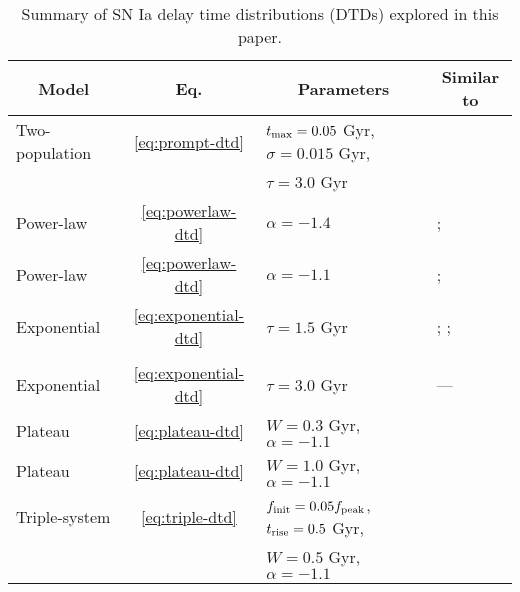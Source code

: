 \documentclass[twocolumn,twocolappendix,linenumbers,trackchanges]{aastex631}
\begin{document}
\begin{table*}
    \centering
    \caption{Summary of SN Ia delay time distributions (DTDs) explored in this paper.}
    \label{tab:dtds}
    \begin{tabular}{lcll}
        \hline\hline
        \multicolumn{1}{c}{Model} & Eq. & \multicolumn{1}{c}{Parameters} & \multicolumn{1}{c}{Similar to} \\
        \hline
        Two-population  & \ref{eq:prompt-dtd}   & $t_{\rm max}=0.05$ Gyr, $\sigma=0.015$ Gyr, & \citet{Mannucci2006-TwoPopulations} \\
                        &                       & $\tau=3.0$ Gyr & \\
        Power-law   & \ref{eq:powerlaw-dtd} & $\alpha=-1.4$                 & \citet[][cluster]{Maoz2017-CosmicDTD}; 
                                                      \citet{Heringer2019-FieldGalaxyDTD}       \\
        Power-law   & \ref{eq:powerlaw-dtd} & $\alpha=-1.1$                 & \citet[][field]{Maoz2017-CosmicDTD}; 
                                                      \citet{Wiseman2021-DESRates}              \\
        Exponential & \ref{eq:exponential-dtd}  & $\tau=1.5$ Gyr    & \citet[][SD]{Greggio2005-AnalyticalRates};
                                                                      \citet{Schonrich2009-RadialMixing};       \\
                    &                           &                   & \citet{Weinberg2017-ChemicalEquilibrium}  \\
        Exponential & \ref{eq:exponential-dtd}   & $\tau=3.0$ Gyr    & --- \\
        Plateau     & \ref{eq:plateau-dtd}  & $W=0.3$ Gyr, $\alpha=-1.1$    & \citet[][CLOSE DD]{Greggio2005-AnalyticalRates} \\
        Plateau     & \ref{eq:plateau-dtd}  & $W=1.0$ Gyr, $\alpha=-1.1$    & \citet[][WIDE DD]{Greggio2005-AnalyticalRates} \\
        Triple-system   & \ref{eq:triple-dtd}   & $f_{\rm init}=0.05f_{\rm peak}$, $t_{\rm rise}=0.5$ Gyr, & \citet{Rajamuthukumar2023-TripleEvolution} \\
                        &                       & $W=0.5$ Gyr, $\alpha=-1.1$ & \\
        \hline
    \end{tabular}
\end{table*}
\end{document}
